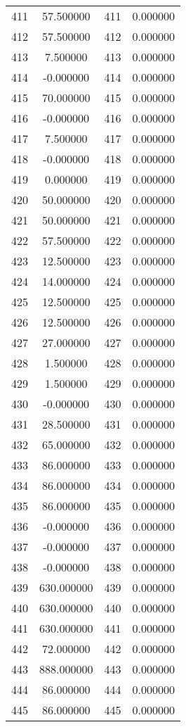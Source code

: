 \documentclass[12pt]{article}
\begin{document}
\begin{longtable}{@{}cccc@{}}
411 & 57.500000 & 411 & 0.000000 \\
412 & 57.500000 & 412 & 0.000000 \\
413 & 7.500000 & 413 & 0.000000 \\
414 & -0.000000 & 414 & 0.000000 \\
415 & 70.000000 & 415 & 0.000000 \\
416 & -0.000000 & 416 & 0.000000 \\
417 & 7.500000 & 417 & 0.000000 \\
418 & -0.000000 & 418 & 0.000000 \\
419 & 0.000000 & 419 & 0.000000 \\
420 & 50.000000 & 420 & 0.000000 \\
421 & 50.000000 & 421 & 0.000000 \\
422 & 57.500000 & 422 & 0.000000 \\
423 & 12.500000 & 423 & 0.000000 \\
424 & 14.000000 & 424 & 0.000000 \\
425 & 12.500000 & 425 & 0.000000 \\
426 & 12.500000 & 426 & 0.000000 \\
427 & 27.000000 & 427 & 0.000000 \\
428 & 1.500000 & 428 & 0.000000 \\
429 & 1.500000 & 429 & 0.000000 \\
430 & -0.000000 & 430 & 0.000000 \\
431 & 28.500000 & 431 & 0.000000 \\
432 & 65.000000 & 432 & 0.000000 \\
433 & 86.000000 & 433 & 0.000000 \\
434 & 86.000000 & 434 & 0.000000 \\
435 & 86.000000 & 435 & 0.000000 \\
436 & -0.000000 & 436 & 0.000000 \\
437 & -0.000000 & 437 & 0.000000 \\
438 & -0.000000 & 438 & 0.000000 \\
439 & 630.000000 & 439 & 0.000000 \\
440 & 630.000000 & 440 & 0.000000 \\
441 & 630.000000 & 441 & 0.000000 \\
442 & 72.000000 & 442 & 0.000000 \\
443 & 888.000000 & 443 & 0.000000 \\
444 & 86.000000 & 444 & 0.000000 \\
445 & 86.000000 & 445 & 0.000000 \\

\end{longtable}
\end{document}
